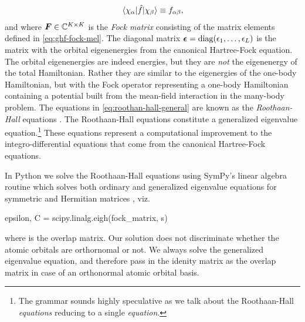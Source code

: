             \begin{align}
                \mel*{\chi_{\alpha}}{\hat{f}}{\chi_{\beta}}
                \equiv f_{\alpha \beta},
                \label{eq:ghf-fock-mel}
            \end{align}
            and where $\boldsymbol{F} \in \mathbb{C}^{K \times K}$ is the \emph{Fock
            matrix} consisting of the matrix elements defined in
            \autoref{eq:ghf-fock-mel}.
            The diagonal matrix $\boldsymbol{\epsilon} = \operatorname{diag}(\epsilon_1, \dots,
            \epsilon_L)$ is the matrix with the orbital eigenenergies from the
            canonical Hartree-Fock equation.
            The orbital eigenenergies are indeed energies, but they are
            \emph{not} the eigenenergy of the total Hamiltonian.
            Rather they are similar to the eigenergies of the one-body
            Hamiltonian, but with the Fock operator representing a one-body
            Hamiltonian containing a potential built from the mean-field
            interaction in the many-body problem.
            The equations in \autoref{eq:roothan-hall-general} are known as the
            \emph{Roothaan-Hall} equations \cite{roothan, hall}.
            The Roothaan-Hall equations constitute a generalized eigenvalue
            equation.\footnote{%
                The grammar sounds highly speculative as we talk about the
                Roothaan-Hall \emph{equations} reducing to a single
                \emph{equation}.
            }
            These equations represent a computational improvement to the
            integro-differential equations that come from the canonical
            Hartree-Fock equations.

            In Python we solve the Roothaan-Hall equations using SymPy's linear
            algebra routine  which solves both ordinary
            and generalized eigenvalue equations for symmetric and Hermitian
            matrices \cite{sympy}, viz.
            \begin{python}
epsilon, C = scipy.linalg.eigh(fock_matrix, s)
            \end{python}
            where  is the overlap matrix.
            Our solution does not discriminate whether the atomic orbitals are
            orthornomal or not.
            We always solve the generalized eigenvalue equation, and therefore
            pass in the idenity matrix as the overlap matrix in case of an
            orthonormal atomic orbital basis.

